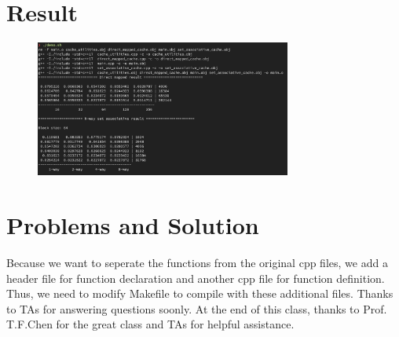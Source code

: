 \documentclass{article}
\begin{document}
\section{Result}
\begin{figure}[!htb]
    \centering
    \includegraphics[width=0.75\textwidth]{result.png}
\end{figure}
\section{Problems and Solution}
Because we want to seperate the functions from the original cpp files, we add a header file for function declaration and another cpp file for function definition.
Thus, we need to modify Makefile to compile with these additional files. Thanks to TAs for answering questions soonly. At the end of this class, thanks to Prof. T.F.Chen for the great class and TAs for helpful assistance.
\end{document}
